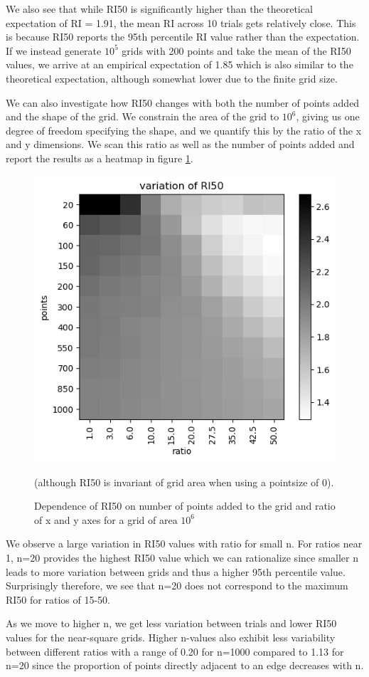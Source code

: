 \documentclass{article}
\begin{document}
We also see that while RI50 is significantly higher than the theoretical expectation of RI = 1.91, the mean RI across 10 trials gets relatively close. This is because RI50 reports the 95th percentile RI value rather than the expectation. If we instead generate $10^5$ grids with 200 points and take the mean of the RI50 values, we arrive at an empirical expectation of 1.85 which is also similar to the theoretical expectation, although somewhat lower due to the finite grid size.

We can also investigate how RI50 changes with both the number of points added and the shape of the grid. We constrain the area of the grid to $10^6$, giving us one degree of freedom specifying the shape, and we quantify this by the ratio of the x and y dimensions. We scan this ratio as well as the number of points added and report the results as a heatmap in figure \ref{fig:RI50}.

\begin{figure}[h]
\centering
\includegraphics[width = 0.4\linewidth, trim={0 0 0 0}, clip=true]{RI50s_gray.png}
\caption{Dependence of RI50 on number of points added to the grid and ratio of x and y axes for a grid of area $10^6$} (although RI50 is invariant of grid area when using a pointsize of 0).
\label{fig:RI50}
\end{figure}

We observe a large variation in RI50 values with ratio for small n. For ratios near 1, n=20 provides the highest RI50 value which we can rationalize since smaller n leads to more variation between grids and thus a higher 95th percentile value. Surprisingly therefore, we see that n=20 does not correspond to the maximum RI50 for ratios of 15-50.

As we move to higher n, we get less variation between trials and lower RI50 values for the near-square grids.
Higher n-values also exhibit less variability between different ratios with a range of 0.20 for n=1000 compared to 1.13 for n=20 since the proportion of points directly adjacent to an edge decreases with n.
\end{document}
